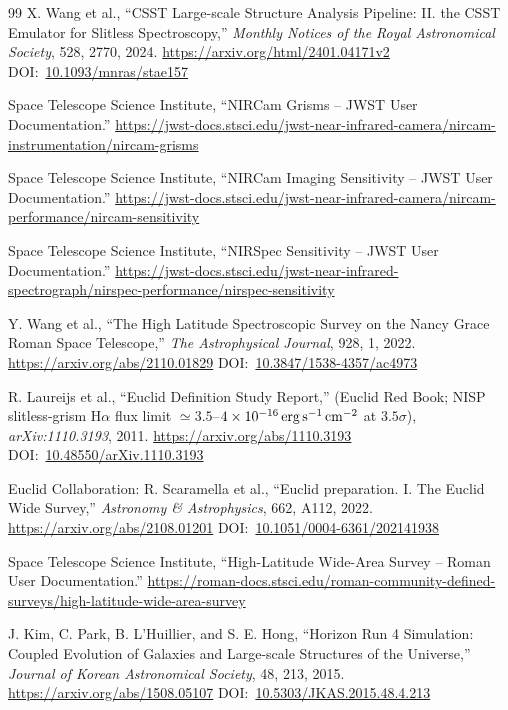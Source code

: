 \documentclass[10pt,onecolumn]{article}
\newcommand{\doi}[1]{DOI:~\href{https://doi.org/#1}{#1}}
\begin{document}
\clearpage
\begin{thebibliography}{99}
X. Wang et al.,
``CSST Large-scale Structure Analysis Pipeline: II. the CSST Emulator for Slitless Spectroscopy,''
\emph{Monthly Notices of the Royal Astronomical Society}, 528, 2770, 2024.
\url{https://arxiv.org/html/2401.04171v2}
\doi{10.1093/mnras/stae157}

Space Telescope Science Institute,
``NIRCam Grisms -- JWST User Documentation.''
\url{https://jwst-docs.stsci.edu/jwst-near-infrared-camera/nircam-instrumentation/nircam-grisms}

Space Telescope Science Institute,
``NIRCam Imaging Sensitivity -- JWST User Documentation.''
\url{https://jwst-docs.stsci.edu/jwst-near-infrared-camera/nircam-performance/nircam-sensitivity}

Space Telescope Science Institute,
``NIRSpec Sensitivity -- JWST User Documentation.''
\url{https://jwst-docs.stsci.edu/jwst-near-infrared-spectrograph/nirspec-performance/nirspec-sensitivity}

Y. Wang et al.,
``The High Latitude Spectroscopic Survey on the Nancy Grace Roman Space Telescope,''
\emph{The Astrophysical Journal}, 928, 1, 2022.
\url{https://arxiv.org/abs/2110.01829}
\doi{10.3847/1538-4357/ac4973}

R. Laureijs et al.,
``Euclid Definition Study Report,'' (Euclid Red Book; NISP slitless-grism H$\alpha$ flux limit $\simeq3.5$--$4\times10^{-16}\,{\rm erg\,s^{-1}\,cm^{-2}}$ at $3.5\sigma$),
\emph{arXiv:1110.3193}, 2011.
\url{https://arxiv.org/abs/1110.3193}
\doi{10.48550/arXiv.1110.3193}

Euclid Collaboration: R. Scaramella et al.,
``Euclid preparation. I. The Euclid Wide Survey,''
\emph{Astronomy \& Astrophysics}, 662, A112, 2022.
\url{https://arxiv.org/abs/2108.01201}
\doi{10.1051/0004-6361/202141938}

Space Telescope Science Institute,
``High-Latitude Wide-Area Survey -- Roman User Documentation.''
\url{https://roman-docs.stsci.edu/roman-community-defined-surveys/high-latitude-wide-area-survey}

J. Kim, C. Park, B. L'Huillier, and S. E. Hong,
``Horizon Run 4 Simulation: Coupled Evolution of Galaxies and Large-scale Structures of the Universe,''
\emph{Journal of Korean Astronomical Society}, 48, 213, 2015.
\url{https://arxiv.org/abs/1508.05107}
\doi{10.5303/JKAS.2015.48.4.213}


\end{thebibliography}
\end{document}
